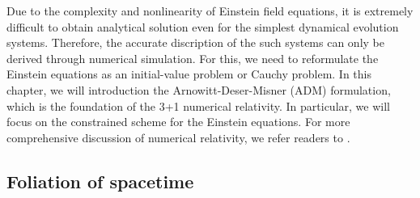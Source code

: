 Due to the complexity and nonlinearity of Einstein field equations, it is extremely difficult to obtain analytical solution even for the simplest dynamical evolution systems.
Therefore, the accurate discription of the such systems can only be derived through numerical simulation.
For this, we need to reformulate the Einstein equations as an initial-value problem or Cauchy problem.
In this chapter, we will introduction the Arnowitt-Deser-Misner (ADM) formulation, which is the foundation of the 3+1 numerical relativity.
In particular, we will focus on the constrained scheme for the Einstein equations.
For more comprehensive discussion of numerical relativity,
we refer readers to \cite{shibata2015numerical,baumgarte2010numerical,gourgoulhon20123+}.

\subsection{Foliation of spacetime} \label{section1.2.1}

